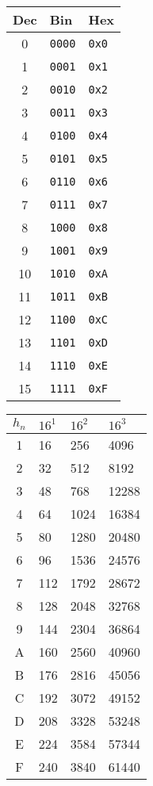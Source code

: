 \begin{tabular}{|c|p{3cm}|p{4cm}|}
\hline
\textbf{Dec} & \textbf{Bin} & \textbf{Hex} \\ \hline
0 & \texttt{0000} & \texttt{0x0} \\ \hline
1 & \texttt{0001} & \texttt{0x1} \\ \hline
2 & \texttt{0010} & \texttt{0x2} \\ \hline
3 & \texttt{0011} & \texttt{0x3} \\ \hline
4 & \texttt{0100} & \texttt{0x4} \\ \hline
5 & \texttt{0101} & \texttt{0x5} \\ \hline
6 & \texttt{0110} & \texttt{0x6} \\ \hline
7 & \texttt{0111} & \texttt{0x7} \\ \hline
8 & \texttt{1000} & \texttt{0x8} \\ \hline
9 & \texttt{1001} & \texttt{0x9} \\ \hline
10 & \texttt{1010} & \texttt{0xA} \\ \hline
11 & \texttt{1011} & \texttt{0xB} \\ \hline
12 & \texttt{1100} & \texttt{0xC} \\ \hline
13 & \texttt{1101} & \texttt{0xD} \\ \hline
14 & \texttt{1110} & \texttt{0xE} \\ \hline
15 & \texttt{1111} & \texttt{0xF} \\ \hline
\end{tabular}

\vspace{0.5cm}
\begin{tabular}{|c|p{2cm}|p{2cm}|p{2cm}|}
\hline
\textbf{\(h_n\)} & \(16^1\) & \(16^2\) & \(16^3\) \\\hline
1 & 16 & 256 & 4096 \\\hline
2 & 32 & 512 & 8192 \\\hline
3 & 48 & 768 & 12288 \\\hline
4 & 64 & 1024 & 16384 \\\hline
5 & 80 & 1280 & 20480 \\\hline
6 & 96 & 1536 & 24576 \\\hline
7 & 112 & 1792 & 28672 \\\hline
8 & 128 & 2048 & 32768 \\\hline
9 & 144 & 2304 & 36864 \\\hline
A & 160 & 2560 & 40960 \\\hline
B & 176 & 2816 & 45056 \\\hline
C & 192 & 3072 & 49152 \\\hline
D & 208 & 3328 & 53248 \\\hline
E & 224 & 3584 & 57344 \\\hline
F & 240 & 3840 & 61440 \\\hline
\end{tabular}

